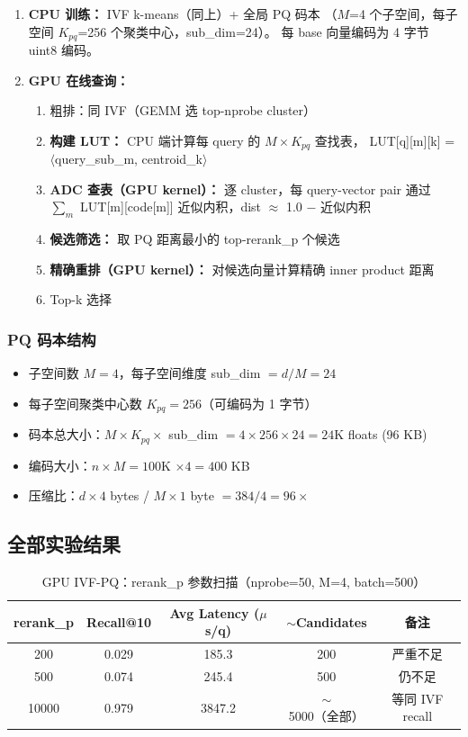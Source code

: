 \documentclass[UTF8,a4paper,10pt]{ctexart}
\begin{document}
\begin{enumerate}[itemsep=0pt]
\item \textbf{CPU 训练：} IVF k-means（同上）+ 全局 PQ 码本
（$M$=4 个子空间，每子空间 $K_{pq}$=256 个聚类中心，sub\_dim=24）。
每 base 向量编码为 4 字节 uint8 编码。
\item \textbf{GPU 在线查询：}
  \begin{enumerate}[itemsep=0pt]
  \item 粗排：同 IVF（GEMM 选 top-nprobe cluster）
  \item \textbf{构建 LUT：} CPU 端计算每 query 的 $M \times K_{pq}$ 查找表，
  LUT[q][m][k] = $\langle$query\_sub\_m, centroid\_k$\rangle$
  \item \textbf{ADC 查表（GPU kernel）：} 逐 cluster，每 query-vector pair 通过
  $\sum_m$ LUT[m][code[m]] 近似内积，dist $\approx$ 1.0 $-$ 近似内积
  \item \textbf{候选筛选：} 取 PQ 距离最小的 top-rerank\_p 个候选
  \item \textbf{精确重排（GPU kernel）：} 对候选向量计算精确 inner product 距离
  \item Top-k 选择
  \end{enumerate}
\end{enumerate}

\subsubsection{PQ 码本结构}

\begin{itemize}[itemsep=0pt]
\item 子空间数 $M=4$，每子空间维度 sub\_dim $= d/M = 24$
\item 每子空间聚类中心数 $K_{pq}=256$（可编码为 1 字节）
\item 码本总大小：$M \times K_{pq} \times$ sub\_dim $= 4 \times 256 \times 24 = 24$K floats (96 KB)
\item 编码大小：$n \times M = 100$K $\times 4 = 400$ KB
\item 压缩比：$d \times 4$ bytes / $M \times 1$ byte $= 384 / 4 = 96\times$
\end{itemize}

\subsection{全部实验结果}

\begin{table}[H]
\centering
\caption{GPU IVF-PQ：rerank\_p 参数扫描（nprobe=50, M=4, batch=500）}
\label{tab:ivfpq-all}
\begin{tabular}{ccccc}
\toprule
rerank\_p & Recall@10 & Avg Latency ($\mu$s/q) & $\sim$Candidates & 备注 \\
\midrule
200  & 0.029 & 185.3 & 200 & 严重不足 \\
500  & 0.074 & 245.4 & 500 & 仍不足 \\
10000 & 0.979 & 3847.2 & $\sim$5000（全部） & 等同 IVF recall \\
\bottomrule
\end{tabular}
\end{table}
\end{document}
